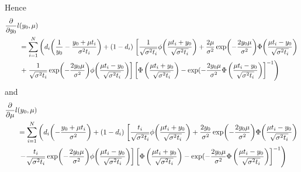 Hence
\begin{align}
\begin{split}
\frac{\partial}{\partial y_0}
l&(y_0, \mu) \\
&=\sum_{i=1}^N\left(
d_i\p*{\frac{1}{y_0}-\frac{y_0+\mu\ti}{\sigma^2\ti}}
+(1-d_i)\right.\left[
    \frac{1}{\sqrt{\sigma^2\ti}}\phi\p*{\frac{\mu\ti+y_0}{\sqrt{\sigma^2\ti}}}+\frac{2\mu}{\sigma^2}\exp\p*{-\frac{2y_0\mu}{\sigma^2}}\Phi\p*{\frac{\mu\ti-y_0}{\sqrt{\sigma^2\ti}}}\right.\\
    &\left.+\left.
    \frac{1}{\sqrt{\sigma^2\ti}}\exp\p*{-\frac{2y_0\mu}{\sigma^2}}\phi\p*{\frac{\mu\ti-y_0}{\sqrt{\sigma^2\ti}}}
\right]\left[ \Phi\left(\frac{\mu t_i + y_0}{\sqrt{\sigma^2 t_i}}\right)-\exp(-\frac{2y_0\mu}{\sigma^2}\Phi\left(\frac{\mu t_i - y_0}{\sqrt{\sigma^2 t_i}}\right)\right]^{-1}\right)
\end{split}
\end{align}
and
\begin{align}
\begin{split}
\frac{\partial}{\partial \mu}
l&(y_0, \mu) \\
&=\sum_{i=1}^N\left(
d_i\p*{-\frac{y_0+\mu\ti}{\sigma^2}}
+(1-d_i)\right.\left[
\frac{\ti}{\sqrt{\sigma^2\ti}}\phi\p*{\frac{\mu\ti+y_0}{\sqrt{\sigma^2\ti}}}+\frac{2y_0}{\sigma^2}\exp\p*{-\frac{2y_0\mu}{\sigma^2}}\Phi\p*{\frac{\mu\ti-y_0}{\sqrt{\sigma^2\ti}}} \right.\\
&\left.\left.-\frac{\ti}{\sqrt{\sigma^2\ti}}\exp\p*{-\frac{2y_0\mu}{\sigma^2}}\phi\p*{\frac{\mu\ti-y_0}{\sqrt{\sigma^2\ti}}}
\right]\left[ \Phi\left(\frac{\mu t_i + y_0}{\sqrt{\sigma^2 t_i}}\right)-\exp(-\frac{2y_0\mu}{\sigma^2}\Phi\left(\frac{\mu t_i - y_0}{\sqrt{\sigma^2 t_i}}\right)\right]^{-1}\right)
\end{split}
\end{align}